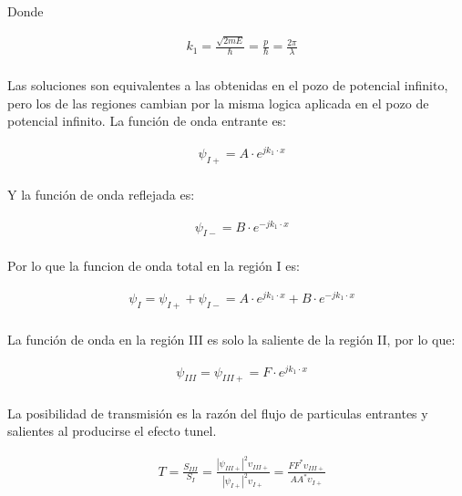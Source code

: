 \documentclass[a4paper]{article}
\begin{document}
            \indent Donde

            \begin{align*}
                &k_1 = \frac{\sqrt{2mE}}{\hbar}= \frac{p}{\hbar}= \frac{2\pi}{\lambda} \\
            \end{align*}

            \indent Las soluciones son equivalentes a las obtenidas en el pozo de potencial infinito, pero los de las regiones cambian por la misma logica aplicada en el pozo de potencial infinito.
              \indent La función de onda entrante es:
            
            \begin{align*}
                &\psi_{I+} = A \cdot e^{jk_1 \cdot x} \\
            \end{align*}

            \indent Y la función de onda reflejada es:

            \begin{align*}
                &\psi_{I-} = B \cdot e^{-jk_1 \cdot x} \\
            \end{align*}

            \indent Por lo que la funcion de onda total en la región I es:

            \begin{align*}
                &\psi_I = \psi_{I+} + \psi_{I-} = A \cdot e^{jk_1 \cdot x} + B \cdot e^{-jk_1 \cdot x} \\
            \end{align*}

            \indent La función de onda en la región III es solo la saliente de la región II, por lo que:

            \begin{align*}
                &\psi_{III} = \psi_{III+}=F \cdot e^{jk_1 \cdot x} \\
            \end{align*}

            \indent La posibilidad de transmisión es la razón del flujo de particulas entrantes y salientes al producirse el efecto tunel. 

   \begin{align*}
                &T = \frac{S_{III}}{S_{I}} = \frac{\left| \psi_{III+} \right|^{2} \upsilon_{III+}}{\left| \psi_{I+} \right|^{2} \upsilon_{I+}} = \frac{FF^{\ast}\upsilon_{III+}}{AA^{\ast}\upsilon_{I+}}  
            \end{align*}
\end{document}
